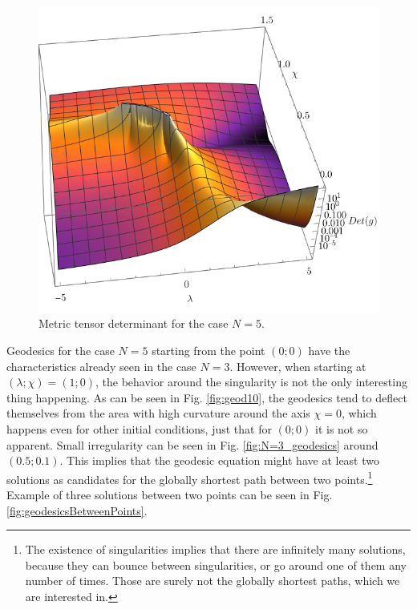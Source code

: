 \begin{figure}[H]
    \centering
    \includegraphics[scale=1.3]{../img/N=5_det3D.pdf}
    \caption{Metric tensor determinant for the case $N=5$.}
    \label{fig:N=5_det3D}    
\end{figure}



Geodesics for the case $N=5$ starting from the point $(0;0)$ have the characteristics already seen in the case $N=3$. However, when starting at $(\lambda;\chi)=(1;0)$, the behavior around the singularity is not the only interesting thing happening. As can be seen in Fig. \ref{fig:geod10}, the geodesics tend to deflect themselves from the area with high curvature around the axis $\chi=0$, which happens even for other initial conditions, just that for $(0;0)$ it is not so apparent. Small irregularity can be seen in Fig. \ref{fig:N=3_geodesics} around $(0.5;0.1)$. This implies that the geodesic equation might have at least two solutions as candidates for the globally shortest path between two points.\footnote{The existence of singularities implies that there are infinitely many solutions, because they can bounce between singularities, or go around one of them any number of times. Those are surely not the globally shortest paths, which we are interested in.} Example of three solutions between two points can be seen in Fig. \ref{fig:geodesicsBetweenPoints}.
 



